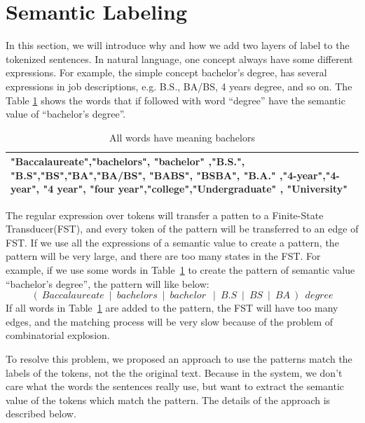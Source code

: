 \section{Semantic Labeling}

In this section, we will introduce why and how we add two layers of label to the tokenized sentences. In natural language, one concept always have some different expressions. For example, the simple concept bachelor's degree,  has several expressions in job descriptions, e.g. B.S., BA/BS, 4 years degree, and so on. The Table \ref{tab:multispelling} shows the words that if followed with word ``degree'' have the semantic value of ``bachelor's degree''.

\begin{table}[ht]
\caption{All words have meaning bachelors } %
\centering %
\begin{tabular}{  | p{15cm} |  }
 \hline
 "Baccalaureate","bachelors", "bachelor" ,"B.S.", "B.S","BS","BA","BA/BS", "BABS", "BSBA", "B.A." ,"4-year","4-year", "4 year", "four year","college","Undergraduate" , "University" \\
  \hline
\end{tabular}
\label{tab:multispelling} %
\end{table}

The regular expression over tokens will transfer a patten to a Finite-State Transducer(FST), and every token of the pattern will be transferred to an edge of FST. If we use all the expressions of a semantic value to create a pattern, the pattern will be very large, and there are too many states in the FST. For example, if we use some words in Table~\ref{tab:multispelling} to create the pattern of semantic value ``bachelor's degree'', the pattern will like below:
$$ (~Baccalaureate~\mid~bachelors~\mid~bachelor~~\mid~B.S~\mid~BS~\mid~BA~)~~degree $$
If all words in Table~\ref{tab:multispelling} are added to the pattern, the FST will have too many edges, and the matching process will be very slow because of the problem of combinatorial explosion.

To resolve this problem, we proposed an approach to use the patterns match the labels of the tokens, not the the original text. Because in the system, we don't care what the words the sentences really use, but want to extract the semantic value of the tokens which match the pattern. The details of the approach is described below.

